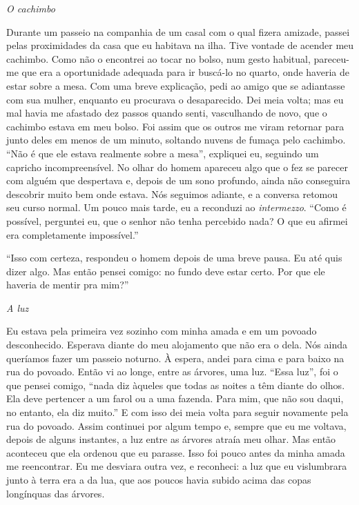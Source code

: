 \emph{O cachimbo}

Durante um passeio na companhia de um casal com o qual fizera amizade,
passei pelas proximidades da casa que eu habitava na ilha. Tive vontade
de acender meu cachimbo. Como não o encontrei ao tocar no bolso, num
gesto habitual, pareceu-me que era a oportunidade adequada para ir
buscá-lo no quarto, onde haveria de estar sobre a mesa. Com uma breve
explicação, pedi ao amigo que se adiantasse com sua mulher, enquanto eu
procurava o desaparecido. Dei meia volta; mas eu mal havia me afastado
dez passos quando senti, vasculhando de novo, que o cachimbo estava em
meu bolso. Foi assim que os outros me viram retornar para junto deles em
menos de um minuto, soltando nuvens de fumaça pelo cachimbo. ``Não é que
ele estava realmente sobre a mesa'', expliquei eu, seguindo um capricho
incompreensível. No olhar do homem apareceu algo que o fez se parecer
com alguém que despertava e, depois de um sono profundo, ainda não
conseguira descobrir muito bem onde estava. Nós seguimos adiante, e a
conversa retomou seu curso normal. Um pouco mais tarde, eu a reconduzi
ao \emph{intermezzo}. ``Como é possível, perguntei eu, que o senhor não
tenha percebido nada? O que eu afirmei era completamente impossível.''

``Isso com certeza, respondeu o homem depois de uma breve pausa. Eu até
quis dizer algo. Mas então pensei comigo: no fundo deve estar certo. Por
que ele haveria de mentir pra mim?''

\emph{A luz }

Eu estava pela primeira vez sozinho com minha amada e em um povoado
desconhecido. Esperava diante do meu alojamento que não era o dela. Nós
ainda queríamos fazer um passeio noturno. À espera, andei para cima e
para baixo na rua do povoado. Então vi ao longe, entre as árvores, uma
luz. ``Essa luz'', foi o que pensei comigo, ``nada diz àqueles que todas
as noites a têm diante do olhos. Ela deve pertencer a um farol ou a uma
fazenda. Para mim, que não sou daqui, no entanto, ela diz muito.'' E com
isso dei meia volta para seguir novamente pela rua do povoado. Assim
continuei por algum tempo e, sempre que eu me voltava, depois de alguns
instantes, a luz entre as árvores atraía meu olhar. Mas então aconteceu
que ela ordenou que eu parasse. Isso foi pouco antes da minha amada me
reencontrar. Eu me desviara outra vez, e reconheci: a luz que eu
vislumbrara junto à terra era a da lua, que aos poucos havia subido
acima das copas longínquas das árvores.

